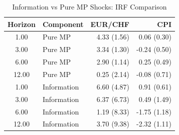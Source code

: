 \begin{table}[ht]
\centering
\caption{Information vs Pure MP Shocks: IRF Comparison} 
\label{tab:info_effects_results}
\begin{tabular}{clrr}
  \toprule
Horizon & Component & EUR/CHF & CPI \\ 
  \midrule
1.00 & Pure MP & 4.33 (1.56) & 0.06 (0.30) \\ 
  3.00 & Pure MP & 3.34 (1.30) & -0.24 (0.50) \\ 
  6.00 & Pure MP & 2.90 (1.14) & 0.25 (0.49) \\ 
  12.00 & Pure MP & 0.25 (2.14) & -0.08 (0.71) \\ 
  1.00 & Information & 6.60 (4.87) & 0.91 (0.61) \\ 
  3.00 & Information & 6.37 (6.73) & 0.49 (1.49) \\ 
  6.00 & Information & 1.19 (8.33) & -1.75 (1.18) \\ 
  12.00 & Information & 3.70 (9.38) & -2.32 (1.11) \\ 
   \bottomrule
\end{tabular}
\end{table}
